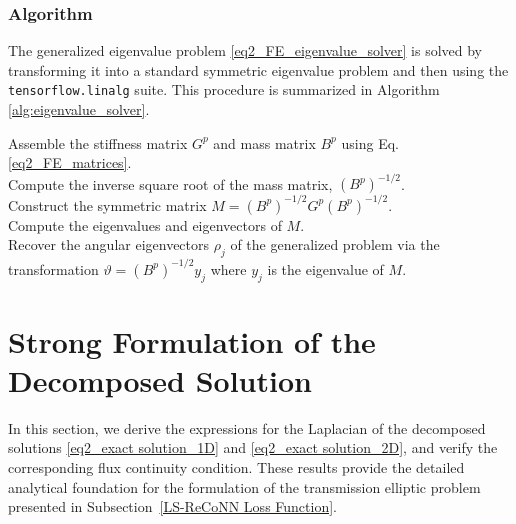 \documentclass[oneside]{article}
\begin{document}
\subsubsection{Algorithm}

The generalized eigenvalue problem \eqref{eq2_FE_eigenvalue_solver} is solved by transforming it into a standard symmetric eigenvalue problem and then using the \texttt{tensorflow.linalg} suite. This procedure is summarized in Algorithm \ref{alg:eigenvalue_solver}.

\begin{algorithm}[H]
\SetAlgoLined
\DontPrintSemicolon 
Assemble the stiffness matrix $G^p$ and mass matrix $B^p$ using Eq. \eqref{eq2_FE_matrices}.\\
Compute the inverse square root of the mass matrix, $(B^p)^{-1/2}$.\\%
Construct the symmetric matrix $M = (B^p)^{-1/2} G^p (B^p)^{-1/2}$.\\
Compute the eigenvalues and eigenvectors of $M$.\\%
Recover the angular eigenvectors $\rho_j$ of the generalized problem via the transformation $\vartheta = (B^p)^{-1/2} y_j$ where $y_j$ is the eigenvalue of $M$.\\
\caption{Implementation for solving the FE eigenvalue problem}\label{alg:eigenvalue_solver}
\end{algorithm}


\section{Strong Formulation of the Decomposed Solution}\label{Strong Formulation of the Decomposed Solution}

In this section, we derive the expressions for the Laplacian of the decomposed solutions \eqref{eq2_exact solution_1D} and \eqref{eq2_exact solution_2D}, and verify the corresponding flux continuity condition. These results provide the detailed analytical foundation for the formulation of the transmission elliptic problem presented in Subsection~\ref{LS-ReCoNN Loss Function}.
\end{document}
